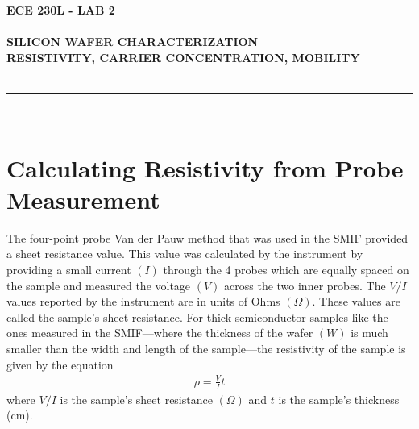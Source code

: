 \documentclass[12pt]{../manual}
\begin{document}
\begin{center}
\textbf{\huge ECE 230L - LAB 2}\\~\\
\textbf{\large SILICON WAFER CHARACTERIZATION \\
RESISTIVITY, CARRIER CONCENTRATION, MOBILITY}\\~\\
\rule{6.5in}{0.5mm}\\
\end{center}

\tableofcontents

\newpage
%
\section*{Calculating Resistivity from Probe Measurement}

The four-point probe Van der Pauw method that was used in the SMIF provided a sheet resistance value.  This value was calculated by the instrument by providing a small current $(I)$ through the 4 probes which are equally spaced on the sample and measured the voltage $(V)$ across the two inner probes.  The $V/I$ values reported by the instrument are in units of Ohms $(\Omega)$.  These values are called the sample's sheet resistance.  For thick semiconductor samples like the ones measured in the SMIF---where the thickness of the wafer $(W)$ is much smaller than the width and length of the sample---the resistivity of the sample is given by the equation
\begin{align}
\rho = \frac{V}{I} t
\end{align}
where $V/I$ is the sample's sheet resistance $(\Omega)$ and $t$ is the sample's thickness (cm).

\newpage
\end{document}

